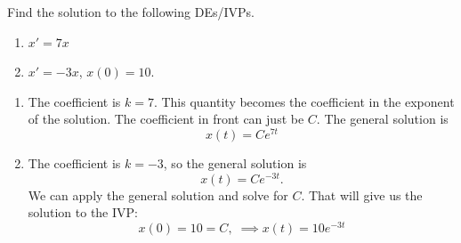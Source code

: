 \documentclass[09pt,letterpaper]{article}
\begin{document}
\begin{example}[2]{
Find the solution to the following DEs/IVPs. 
\begin{enumerate}
    \item[a)] $x'=7x$
    \item[b)] $x' = -3x$, $x(0)=10$.
\end{enumerate}
}
\begin{enumerate}
    \item[a)]
    The coefficient is $k=7$. This quantity becomes the coefficient in the exponent of the solution. The coefficient in front can just be $C$. The general solution is 
    $$
    \boxed{
        x(t) = C e^{7t}
    }
    $$
    \item[b)]
    The coefficient is $k=-3$, so the general solution is 
    $$
        x(t) = C e^{-3t}.
    $$
    We can apply the general solution and solve for $C$. That will give us the solution to the IVP:
    $$
        x(0)=10 =C, \;\implies \boxed{x(t)= 10e^{-3t}}
    $$
\end{enumerate}
\end{example}

\end{document}
